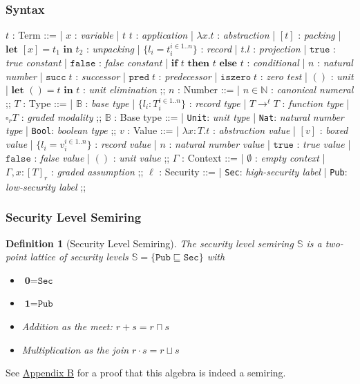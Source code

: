 \documentclass[conference]{IEEEtran}
\newcommand\lam[2]{\lambda #1.#2}
\newcommand\unp[3]{\textbf{let }[#1]=#2\textbf{ in }#3}
\newcommand\une[2]{\textbf{let }\unt=#1\textbf{ in }#2}
\newcommand\gradedt[2]{\square_{#1} #2}
\newcommand\public{\texttt{Pub}}
\newcommand\secret{\texttt{Sec}}
\newcommand\secure{\mathbb{S}}
\newcommand\true{\texttt{true}}
\newcommand\false{\texttt{false}}
\newcommand\bool{\texttt{Bool}}
\newcommand\nat{\texttt{Nat}}
\newcommand\suc[1]{\texttt{succ}\; #1}
\newcommand\prd[1]{\texttt{pred}\; #1}
\newcommand\iszero[1]{\texttt{iszero}\; #1}
\newcommand\unt{()}
\newcommand\untt{\texttt{Unit}}
\newcommand\cond[3]{\textbf{if }#1\textbf{ then }#2\textbf{ else }#3}
\newcommand\srzero{\textbf{0}}
\newcommand\srone{\textbf{1}}
\newcommand\base{\mathbb{B}}
\newtheorem{definition}{Definition}
\begin{document}
\subsubsection{Syntax}
\begin{center}
	\begin{bnf}
		$t$ : \textsf{Term} ::=
		| $x$ : \textit{variable}
		| $t$ $t$ : \textit{application}
		| $\lam{x}{t}$ : \textit{abstraction}
		| $[t]$ : \textit{packing}
		| $\unp{x}{t_1}{t_2}$ : \textit{unpacking}
		| $\{l_i=t_i^{i\in1..n}\}$ : \textit{record}
		| $t.l$ : \textit{projection}
		| $\true$ : \textit{true constant}
		| $\false$ : \textit{false constant}
		| $\cond{t}{t}{t}$ : \textit{conditional}
		| $n$ : \textit{natural number}
		| $\suc{t}$ : \textit{successor}
		| $\prd{t}$ : \textit{predecessor}
		| $\iszero{t}$ : \textit{zero test}
		| $\unt$ : \textit{unit}
		| $\une{t}{t}$ : \textit{unit elimination}
		;;
		$n$ : \textsf{Number} ::=
		| $n\in\mathbb{N}$ : \textit{canonical numeral}
		;;
		$T$ : \textsf{Type} ::=
		| $\base$ : \textit{base type}
		| $\{l_i\colon T_i^{i\in1..n}\}$ : \textit{record type}
		| $T\to^\ell T$ : \textit{function type}
		| $\gradedt{r}{T}$ : \textit{graded modality}
		;;
		$\base$ : \textsf{Base type} ::=
		| \untt : \textit{unit type}
		| \nat : \textit{natural number type}
		| \bool : \textit{boolean type}
		;;
		$v$ : \textsf{Value} ::=
		| $\lam{x\colon T}{t}$ : \textit{abstraction value}
		| $[v]$ : \textit{boxed value}
		| $\{l_i=v_i^{i\in1..n}\}$ : \textit{record value}
		| $n$ : \textit{natural number value}
		| $\true$ : \textit{true value}
		| $\false$ : \textit{false value}
		| $\unt$ : \textit{unit value}
		;;
		$\Gamma$ : \textsf{Context} ::=
		| $\emptyset$ : \textit{empty context}
		| $\Gamma,x\colon[T]_r$ : \textit{graded assumption}
		;;
		$\ell$ : \textsf{Security} ::=
		| \secret : \textit{high-security label}
		| \public : \textit{low-security label}
		;;
	\end{bnf}
\end{center}

\subsubsection{Security Level Semiring}

\begin{definition}[Security Level Semiring]
The security level semiring $\mathbb{S}$ is a two-point lattice of security levels $\secure=\{\public\sqsubseteq\secret\}$ with 
\begin{itemize}
	\item $\srzero=\secret$
	\item $\srone=\public$
	\item Addition as the meet: $r+s=r\sqcap s$
	\item Multiplication as the join $r\cdot s=r\sqcup s$
\end{itemize}
\end{definition}
See \hyperref[app-b]{Appendix B} for a proof that this algebra is indeed a semiring.
\end{document}
